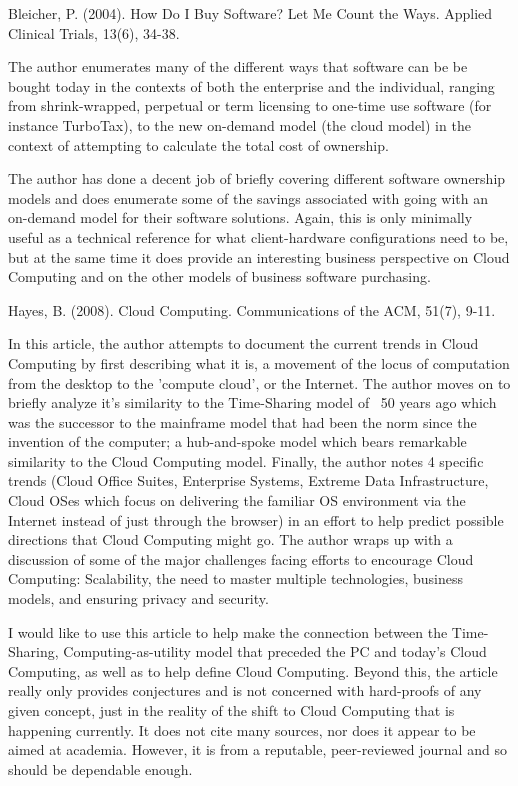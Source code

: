 \documentclass[12pt,oneside,letterpaper,titlepage]{article}
\begin{document}
Bleicher, P. (2004). How Do I Buy Software? Let Me Count the Ways. Applied Clinical Trials, 13(6), 34-38.

The author enumerates many of the different ways that software can be be bought
today in the contexts of both the enterprise and the individual, ranging from
shrink-wrapped, perpetual or term licensing to one-time use software (for
instance TurboTax), to the new on-demand model (the cloud model) in the context
of attempting to calculate the total cost of ownership.

The author has done a decent job of briefly covering different software
ownership models and does enumerate some of the savings associated with going
with an on-demand model for their software solutions. Again, this is only
minimally useful as a technical reference for what client-hardware
configurations need to be, but at the same time it does provide an interesting
business perspective on Cloud Computing and on the other models of business
software purchasing.

Hayes, B. (2008). Cloud Computing. Communications of the ACM, 51(7), 9-11.

In this article, the author attempts to document the current trends in Cloud
Computing by first describing what it is, a movement of the locus of computation
from the desktop to the 'compute cloud', or the Internet. The author moves on to
briefly analyze it's similarity to the Time-Sharing model of ~50 years ago which
was the successor to the mainframe model that had been the norm since the
invention of the computer; a hub-and-spoke model which bears remarkable
similarity to the Cloud Computing model. Finally, the author notes 4 specific
trends (Cloud Office Suites, Enterprise Systems, Extreme Data Infrastructure,
Cloud OSes which focus on delivering the familiar OS environment via the
Internet instead of just through the browser) in an effort to help predict
possible directions that Cloud Computing might go. The author wraps up with a
discussion of some of the major challenges facing efforts to encourage Cloud
Computing: Scalability, the need to master multiple technologies, business
models, and ensuring privacy and security.

I would like to use this article to help make the connection between the
Time-Sharing, Computing-as-utility model that preceded the PC and today's Cloud
Computing, as well as to help define Cloud Computing. Beyond this, the article
really only provides conjectures and is not concerned with hard-proofs of any
given concept, just in the reality of the shift to Cloud Computing that is
happening currently. It does not cite many sources, nor does it appear to be
aimed at academia. However, it is from a reputable, peer-reviewed journal and so
should be dependable enough.
\end{document}
